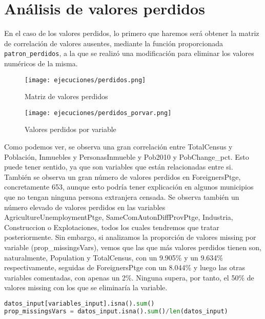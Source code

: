 \documentclass[a4paper,onecolumn]{extarticle}
\let\stdsection\section
\renewcommand\section{\newpage\stdsection}
\begin{document}
\begin{sloppypar}
\section{Análisis de valores perdidos}\label{perdidos}
En el caso de los valores perdidos, lo primero que haremos será obtener la matriz de correlación de valores ausentes, mediante la función proporcionada 
\texttt{patron\_perdidos}, a la que se realizó una modificación para eliminar los valores numéricos de la misma.
\begin{figure}[h!]
    \centering
    \begin{minipage}{0.50\textwidth}
        \centering
        \texttt{[image: ejecuciones/perdidos.png]}
        \caption{Matriz de valores perdidos}
        \label{fig:perdidos}
    \end{minipage}%
    \hspace{0.05\textwidth} %
    \begin{minipage}{0.40\textwidth}
        \centering
        \texttt{[image: ejecuciones/perdidos\_porvar.png]}
        \caption{Valores perdidos por variable}
        \label{fig:perdidosporvar}
    \end{minipage}
\end{figure}

Como podemos ver, se observa una gran correlación entre TotalCensus y Población, Inmuebles y PersonasInmueble y Pob2010 y PobChange\_pct. Esto puede tener sentido,
ya que son variables que están relacionadas entre si. También se observa un gran número de valores perdidos en ForeignersPtge, concretamente 653, aunque esto 
podría tener explicación en algunos municipios que no tengan ninguna persona extranjera censada. Se observa también un número elevado de valores perdidos en las 
variables AgricultureUnemploymentPtge, SameComAutonDiffProvPtge, Industria, Construccion o Explotaciones, todos los cuales tendremos que tratar posteriormente. 
Sin embargo, si analizamos la proporción de valores missing por variable (prop\_missingsVars), vemos que las que más valores perdidos tienen son, naturalmente, 
Population y TotalCensus, con un 9.905\% y un 9.634\% respectivamente, seguidas de ForeignersPtge con un 8.044\% y luego las otras variables comentadas, con 
apenas un 2\%. Ninguna supera, por tanto, el 50\% de valores missing con los que se eliminaría la variable.

\begin{lstlisting}[language=Python]
datos_input[variables_input].isna().sum()
prop_missingsVars = datos_input.isna().sum()/len(datos_input)


\end{lstlisting}
\end{sloppypar}
\end{document}
